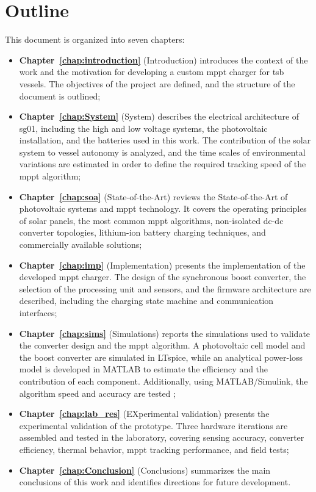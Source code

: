 \section{Outline}

This document is organized into seven chapters:

\begin{itemize}[leftmargin=4em, itemsep=1pt, topsep=2pt]
    \item \textbf{Chapter~\ref{chap:introduction}} (Introduction) introduces the context of the work and the motivation for developing a custom \acs{mppt} charger for \acs{tsb} vessels. The objectives of the project are defined, and the structure of the document is outlined;

    \item \textbf{Chapter~\ref{chap:System}} (System) describes the electrical architecture of \acs{sg01}, including the high and low voltage systems, the photovoltaic installation, and the batteries used in this work. The contribution of the solar system to vessel autonomy is analyzed, and the time scales of environmental variations are estimated in order to define the required tracking speed of the \acs{mppt} algorithm;

    \item \textbf{Chapter~\ref{chap:soa}} (State-of-the-Art) reviews the State-of-the-Art of photovoltaic systems and \acs{mppt} technology. It covers the operating principles of solar panels, the most common \acs{mppt} algorithms, non-isolated \acs{dc}-\acs{dc} converter topologies, lithium-ion battery charging techniques, and commercially available solutions;

    \item \textbf{Chapter~\ref{chap:imp}} (Implementation) presents the implementation of the developed \ac{mppt} charger. The design of the synchronous boost converter, the selection of the processing unit and sensors, and the firmware architecture are described, including the charging state machine and communication interfaces;

    \item \textbf{Chapter~\ref{chap:sims}} (Simulations) reports the simulations used to validate the converter design and the \acs{mppt} algorithm. A photovoltaic cell model and the boost converter are simulated in LTspice, while an analytical power-loss model is developed in MATLAB to estimate the efficiency and the contribution of each component. Additionally, using MATLAB/Simulink, the algorithm speed and accuracy are tested ;

    \item \textbf{Chapter~\ref{chap:lab_res}} (EXperimental validation) presents the experimental validation of the prototype. Three hardware iterations are assembled and tested in the laboratory, covering sensing accuracy, converter efficiency, thermal behavior, \acs{mppt} tracking performance, and field tests;

    \item \textbf{Chapter~\ref{chap:Conclusion}} (Conclusions) summarizes the main conclusions of this work and identifies directions for future development.
\end{itemize}
    
